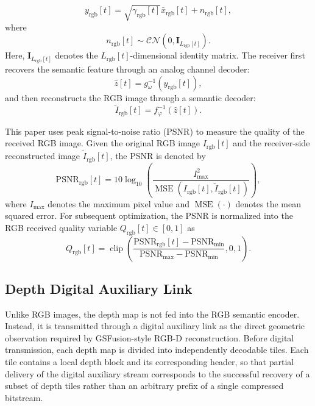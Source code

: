 \documentclass[journal]{IEEEtran}
\begin{document}
\begin{equation}
y_{\mathrm{rgb}}[t]
=
\sqrt{
\gamma_{\mathrm{rgb}}[t]
}
\bar{x}_{\mathrm{rgb}}[t]
+
n_{\mathrm{rgb}}[t],
\end{equation}
where
\begin{equation}
n_{\mathrm{rgb}}[t]
\sim
\mathcal{CN}
\left(
0,
\mathbf{I}_{L_{\mathrm{rgb}}[t]}
\right).
\end{equation}
Here, $\mathbf{I}_{L_{\mathrm{rgb}}[t]}$ denotes the $L_{\mathrm{rgb}}[t]$-dimensional identity matrix. The receiver first recovers the semantic feature through an analog channel decoder:
\begin{equation}
\hat{z}[t]
=
g_{\omega}^{-1}
\left(
y_{\mathrm{rgb}}[t]
\right),
\end{equation}
and then reconstructs the RGB image through a semantic decoder:
\begin{equation}
\widetilde{I}_{\mathrm{rgb}}[t]
=
f_{\varphi}^{-1}
\left(
\hat{z}[t]
\right).
\end{equation}

This paper uses peak signal-to-noise ratio (PSNR) to measure the quality of the received RGB image. Given the original RGB image $I_{\mathrm{rgb}}[t]$ and the receiver-side reconstructed image $\widetilde{I}_{\mathrm{rgb}}[t]$, the PSNR is denoted by
\begin{equation}
\mathrm{PSNR}_{\mathrm{rgb}}[t]
=
10\log_{10}
\left(
\frac{
I_{\max}^{2}
}
{
\operatorname{MSE}
\left(
I_{\mathrm{rgb}}[t],
\widetilde{I}_{\mathrm{rgb}}[t]
\right)
}
\right),
\end{equation}
where $I_{\max}$ denotes the maximum pixel value and 
$\operatorname{MSE}(\cdot)$ denotes the mean squared error. 
For subsequent optimization, the PSNR is normalized into the RGB received 
quality variable $Q_{\mathrm{rgb}}[t]\in[0,1]$ as
\begin{equation}
Q_{\mathrm{rgb}}[t]
=
\operatorname{clip}
\left(
\frac{
\mathrm{PSNR}_{\mathrm{rgb}}[t]
-
\mathrm{PSNR}_{\min}
}
{
\mathrm{PSNR}_{\max}
-
\mathrm{PSNR}_{\min}
},
0,
1
\right).
\label{eq:q_rgb_normalization}
\end{equation}

\subsection{Depth Digital Auxiliary Link}

Unlike RGB images, the depth map is not fed into the RGB semantic encoder. 
Instead, it is transmitted through a digital auxiliary link as the direct geometric observation required by GSFusion-style RGB-D reconstruction. 
Before digital transmission, each depth map is divided into independently decodable tiles. 
Each tile contains a local depth block and its corresponding header, so that partial delivery of the digital auxiliary stream corresponds to the successful recovery of a subset of depth tiles rather than an arbitrary prefix of a single compressed bitstream.
\end{document}

